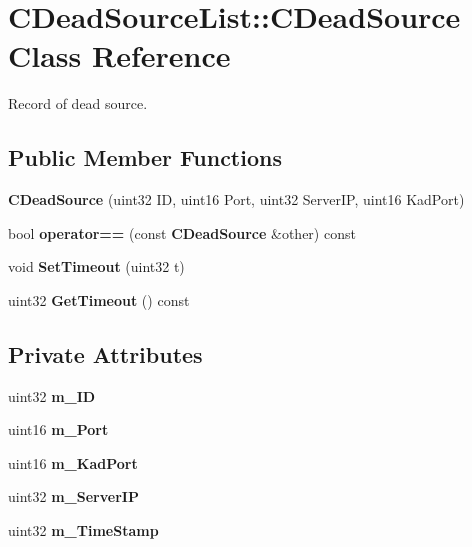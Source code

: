 \section{CDeadSourceList::CDeadSource Class Reference}
\label{classCDeadSourceList_1_1CDeadSource}


Record of dead source.  
\subsection*{Public Member Functions}
\begin{DoxyCompactItemize}
\item 
{\bf CDeadSource} (uint32 ID, uint16 Port, uint32 ServerIP, uint16 KadPort)
\item 
bool {\bf operator==} (const {\bf CDeadSource} \&other) const \label{classCDeadSourceList_1_1CDeadSource_a7d07ce71d18c56d582e72ac7123a767f}

\item 
void {\bf SetTimeout} (uint32 t)\label{classCDeadSourceList_1_1CDeadSource_a8628a58f6e7f2ef22b8511b0dc26db91}

\item 
uint32 {\bf GetTimeout} () const \label{classCDeadSourceList_1_1CDeadSource_acb4aaced64e95c67586da10f3a7a5be0}

\end{DoxyCompactItemize}
\subsection*{Private Attributes}
\begin{DoxyCompactItemize}
\item 
uint32 {\bf m\_\-ID}\label{classCDeadSourceList_1_1CDeadSource_a9269a5681b039fe8aa9ba1723038adf1}

\item 
uint16 {\bf m\_\-Port}\label{classCDeadSourceList_1_1CDeadSource_a418fbda2b23fbafb3b9b75be8671a60a}

\item 
uint16 {\bf m\_\-KadPort}\label{classCDeadSourceList_1_1CDeadSource_a64b0df1de999fe0de7e9bb134a81c50a}

\item 
uint32 {\bf m\_\-ServerIP}\label{classCDeadSourceList_1_1CDeadSource_ac984bdea9aa6e2b7edf8480fe6cb3f8a}

\item 
uint32 {\bf m\_\-TimeStamp}\label{classCDeadSourceList_1_1CDeadSource_af257ffc899d43ae8adc3847dc970e371}

\end{DoxyCompactItemize}


